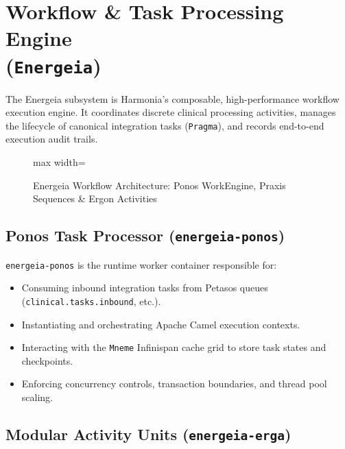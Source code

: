 
\chapter[Workflow \& Task Processing Engine (Energeia)]{Workflow \& Task Processing Engine\\(\texttt{Energeia})}
\label{chap:workflow_energeia}

The Energeia subsystem is Harmonia's composable, high-performance workflow execution engine. It coordinates discrete clinical processing activities, manages the lifecycle of canonical integration tasks (\texttt{Pragma}), and records end-to-end execution audit trails.

\begin{figure}[htbp]
    \centering
    \begin{adjustbox}{max width=\textwidth}
        
    \end{adjustbox}
    \caption{Energeia Workflow Architecture: Ponos WorkEngine, Praxis Sequences \& Ergon Activities}
    \label{fig:energeia_workflow}
\end{figure}

\section{Ponos Task Processor (\texttt{energeia-ponos})}

\texttt{energeia-ponos} is the runtime worker container responsible for:
\begin{itemize}
    \item Consuming inbound integration tasks from Petasos queues (\texttt{clinical.tasks.inbound}, etc.).
    \item Instantiating and orchestrating Apache Camel execution contexts.
    \item Interacting with the \texttt{Mneme} Infinispan cache grid to store task states and checkpoints.
    \item Enforcing concurrency controls, transaction boundaries, and thread pool scaling.
\end{itemize}

\section{Modular Activity Units (\texttt{energeia-erga})}

